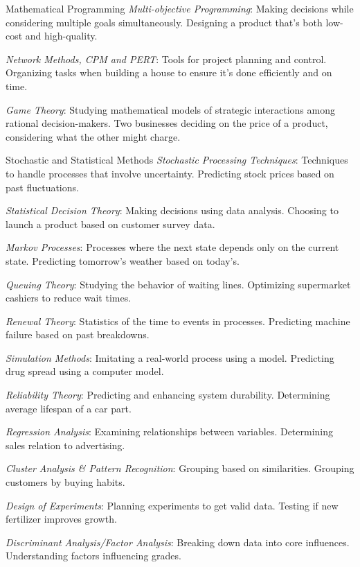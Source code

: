 \documentclass[
    NAME={Dr. Helga Ingimundardóttir},
    EMAIL={helgaingim@hi.is},
    FACULTY={Industrial Engineering},
    TITLE={Local and Global Optimization},
    SUBTITLE={Understanding Optima in Complex Landscapes},
    SEMINAR={VÉL113F},
    DATE={Design and Optimization},
    WIDE=true
]{../HI-latex/hi-beamer}
\begin{document}
\begin{frame}{Mathematical Programming}
        \emph{Multi-objective Programming}: Making decisions while considering multiple goals simultaneously.
        \bi Designing a product that's both low-cost and high-quality. \ei

        \emph{Network Methods, CPM and PERT}: Tools for project planning and control.
        \bi Organizing tasks when building a house to ensure it's done efficiently and on time. \ei

        \emph{Game Theory}: Studying mathematical models of strategic interactions among rational decision-makers.
        \bi Two businesses deciding on the price of a product, considering what the other might charge. \ei
    \end{frame}

    \begin{frame}{Stochastic and Statistical Methods}
        \small
        \emph{Stochastic Processing Techniques}: Techniques to handle processes that involve uncertainty.
        \bi Predicting stock prices based on past fluctuations.\ei

        \emph{Statistical Decision Theory}: Making decisions using data analysis.
        \bi Choosing to launch a product based on customer survey data.\ei

        \emph{Markov Processes}: Processes where the next state depends only on the current state.
        \bi Predicting tomorrow's weather based on today's.\ei

        \emph{Queuing Theory}: Studying the behavior of waiting lines.
        \bi Optimizing supermarket cashiers to reduce wait times.\ei

        \emph{Renewal Theory}: Statistics of the time to events in processes.
        \bi Predicting machine failure based on past breakdowns.\ei

        \emph{Simulation Methods}: Imitating a real-world process using a model.
        \bi Predicting drug spread using a computer model.\ei

        \emph{Reliability Theory}: Predicting and enhancing system durability.
        \bi Determining average lifespan of a car part.\ei

        \emph{Regression Analysis}: Examining relationships between variables.
        \bi Determining sales relation to advertising.\ei

        \emph{Cluster Analysis \& Pattern Recognition}: Grouping based on similarities.
        \bi Grouping customers by buying habits.\ei

        \emph{Design of Experiments}: Planning experiments to get valid data.
        \bi Testing if new fertilizer improves growth.\ei

        \emph{Discriminant Analysis/Factor Analysis}: Breaking down data into core influences.
        \bi Understanding factors influencing grades.\ei
    \end{frame}
\end{document}
